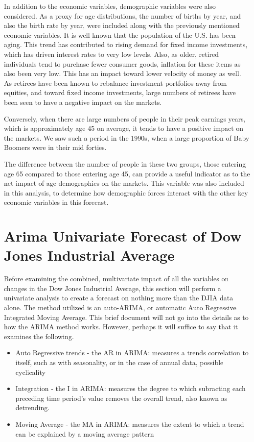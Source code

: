 \documentclass[12pt]{article}         %
\begin{document}
In addition to the economic variables, demographic variables were also considered.  As a proxy for age distributions, the number of births by year, and also the birth rate by year, were included along with the previously mentioned economic variables.  It is well known that the population of the U.S. has been aging.  This trend has contributed to rising demand for fixed income investments, which has driven interest rates to very low levels.  Also, as older, retired individuals tend to purchase fewer consumer goods, inflation for these items as also been very low.  This has an impact toward lower velocity of money as well.  As retirees have been known to rebalance investment portfolios away from equities, and toward fixed income investments, large numbers of retirees have been seen to have a negative impact on the markets.  

Conversely, when there are large numbers of people in their peak earnings years, which is approximately age 45 on average, it tends to have a positive impact on the markets.  We saw such a period in the 1990s, when a large proportion of Baby Boomers were in their mid forties.  

The difference between the number of people in these two groups, those entering age 65 compared to those entering age 45, can provide a useful indicator as to the net impact of age demographics on the markets.  This variable was also included in this analysis, to determine how demographic forces interact with the other key economic variables in this forecast.



\section{Arima Univariate Forecast of Dow Jones Industrial Average}

Before examining the combined, multivariate impact of all the variables on changes in the Dow Jones Industrial Average, this section will perform a univariate analysis to create a forecast on nothing more than the DJIA data alone.  The method utilized is an auto-ARIMA, or automatic Auto Regressive Integrated Moving Average.  This brief document will not go into the details as to how the ARIMA method works.  However, perhaps it will suffice to say that it examines the following.

\begin{itemize}
\item Auto Regressive trends - the AR in ARIMA: measures a trends correlation to itself, such as with seasonality, or in the case of annual data, possible cyclicality
\item Integration - the I in ARIMA: measures the degree to which subracting each preceding time period's value removes the overall trend, also known as detrending.
\item Moving Average - the MA in ARIMA: measures the extent to which a trend can be explained by a moving average pattern
\end{itemize}
\end{document}
